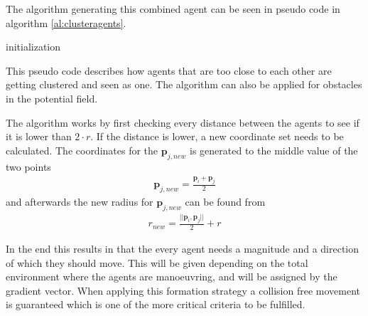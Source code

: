 \documentclass[conference]{IEEEtran}
\begin{document}
The algorithm generating this combined agent can be seen in pseudo
code in algorithm \ref{al:clusteragents}.
\begin{algorithm}[h]
  initialization\;
	\caption{This pseudo code describes how agents that are too close to
		each other are getting clustered and seen as one. The algorithm
		can also be applied for obstacles in the potential
		field.\vspace{3mm}}
  \label{al:clusteragents}
\end{algorithm}

The algorithm works by first checking every distance between the agents to see if it is lower
than $2 \cdot r$. If the distance is lower, a new coordinate set needs
to be calculated. The coordinates for the $\mathbf{p}_{j,new}$ is
generated to the middle value of the two points
\begin{align}
\mathbf{p}_{j,new} = \frac{\mathbf{p}_i + \mathbf{p}_j}{2}
\end{align}
and afterwards the new radius for $\mathbf{p}_{j,new}$ can be found from
\begin{align}
r_{new} = \frac{||\mathbf{p}_i , \mathbf{p}_j||}{2} + r
\end{align}

In the end this results in that the every agent needs a magnitude and
a direction of which they should move. This will be given depending on
the total environment where the agents are manoeuvring, and will be
assigned by the gradient vector. When applying this formation strategy
a collision free movement is guaranteed which is one of the more
critical criteria to be fulfilled. 
\end{document}
